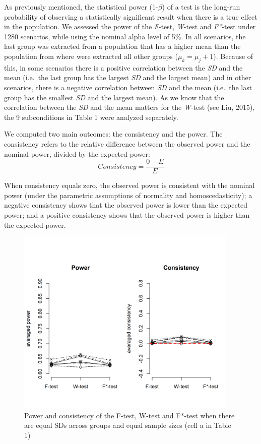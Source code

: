 \documentclass[man,floatsintext]{apa6}
\begin{document}
As previously mentioned, the statistical power (1-\(\beta\)) of a test is the long-run probability of observing a statistically significant result when there is a true effect in the population. We assessed the power of the \emph{F}-test, \emph{W}-test and \emph{F*}-test under 1280 scenarios, while using the nominal alpha level of 5\%. In all scenarios, the last group was extracted from a population that has a higher mean than the population from where were extracted all other groups (\(\mu_k = \mu_j+1\)). Because of this, in some scenarios there is a positive correlation between the \emph{SD} and the mean (i.e.~the last group has the largest \emph{SD} and the largest mean) and in other scenarios, there is a negative correlation between \emph{SD} and the mean (i.e.~the last group has the smallest \emph{SD} and the largest mean). As we know that the correlation between the \emph{SD} and the mean matters for the \emph{W}-test (see Liu, 2015), the 9 subconditions in Table 1 were analyzed separately.

We computed two main outcomes: the consistency and the power. The consistency refers to the relative difference between the observed power and the nominal power, divided by the expected power:
\begin{equation} 
Consistency=\frac{0-E}{E}
\label{eq:RDPWtest}
\end{equation}

When consistency equals zero, the observed power is consistent with the nominal power (under the parametric assumptions of normality and homoscedasticity); a negative consistency shows that the observed power is lower than the expected power; and a positive consistency shows that the observed power is higher than the expected power.

\begin{figure}
\includegraphics[width=400px]{Rmarkdown folder/Rmarkdown inputs/Fig2a} \caption{Power and consistency of the F-test, W-test and F*-test when there are equal SDs across groups and equal sample sizes (cell a in Table 1)}\label{fig:unnamed-chunk-7}
\end{figure}
\end{document}
